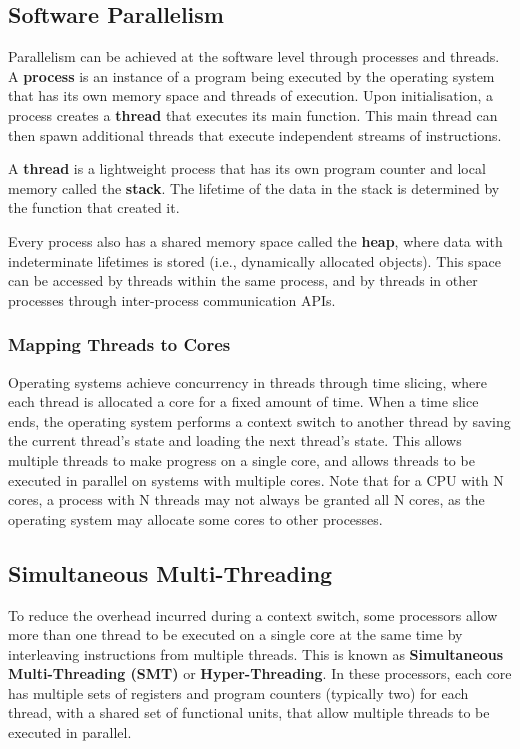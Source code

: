 \documentclass{article}
\begin{document}
\subsection{Software Parallelism}
Parallelism can be achieved at the software level through processes and
threads. A \textbf{process} is an instance of a program being executed
by the operating system that has its own memory space and threads of
execution. Upon initialisation, a process creates a \textbf{thread} that
executes its main function. This main thread can then spawn additional
threads that execute independent streams of instructions.

A \textbf{thread} is a lightweight process that has its own program
counter and local memory called the \textbf{stack}. The lifetime of the
data in the stack is determined by the function that created it.

Every process also has a shared memory space called the \textbf{heap},
where data with indeterminate lifetimes is stored (i.e., dynamically
allocated objects). This space can be accessed by threads within the
same process, and by threads in other processes through inter-process
communication APIs.
\subsubsection{Mapping Threads to Cores}
Operating systems achieve concurrency in threads through time slicing,
where each thread is allocated a core for a fixed amount of time. When
a time slice ends, the operating system performs a context switch to
another thread by saving the current thread's state and loading the
next thread's state. This allows multiple threads to make progress on a
single core, and allows threads to be executed in parallel on systems
with multiple cores. Note that for a CPU with N cores, a process with N
threads may not always be granted all N cores, as the operating system
may allocate some cores to other processes.
\subsection{Simultaneous Multi-Threading}
To reduce the overhead incurred during a context switch, some processors
allow more than one thread to be executed on a single core at the same
time by interleaving instructions from multiple threads. This is known
as \textbf{Simultaneous Multi-Threading (SMT)} or \textbf{Hyper-Threading}.
In these processors, each core has multiple sets of registers and
program counters (typically two) for each thread, with a shared set of
functional units, that allow multiple threads to be executed in parallel.
\end{document}
